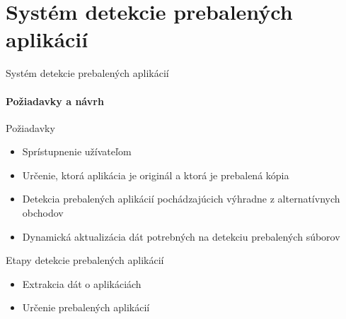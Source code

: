 \documentclass{beamer}
\begin{document}
  \section{Systém detekcie prebalených aplikácií}  
  
  \begin{frame}[label=lists]{Systém detekcie prebalených aplikácií}
 	 \framesubtitle{Požiadavky a návrh}
 	 Požiadavky
		\begin{itemize}
			\item Sprístupnenie užívateľom
			\item Určenie, ktorá aplikácia je originál a ktorá je prebalená kópia
			\item Detekcia prebalených aplikácií pochádzajúcich výhradne z alternatívnych obchodov
			\item Dynamická aktualizácia dát potrebných na detekciu prebalených súborov
		\end{itemize}
   Etapy detekcie prebalených aplikácií
	\begin{itemize}
 		\item Extrakcia dát o aplikáciách
 		\item Určenie prebalených aplikácií
   \end{itemize}
  \end{frame} 
  
\end{document}

